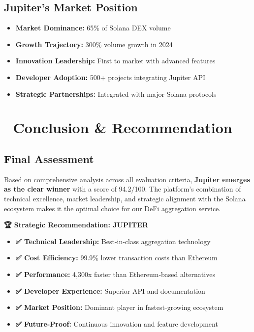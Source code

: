 \documentclass[11pt,a4paper]{article}
\begin{document}
\subsection{Jupiter's Market Position}

\begin{itemize}
    \item \textbf{Market Dominance:} 65\% of Solana DEX volume
    \item \textbf{Growth Trajectory:} 300\% volume growth in 2024
    \item \textbf{Innovation Leadership:} First to market with advanced features
    \item \textbf{Developer Adoption:} 500+ projects integrating Jupiter API
    \item \textbf{Strategic Partnerships:} Integrated with major Solana protocols
\end{itemize}

\section{🎯 Conclusion \& Recommendation}

\subsection{Final Assessment}

Based on comprehensive analysis across all evaluation criteria, \textbf{Jupiter emerges as the clear winner} with a score of 94.2/100. The platform's combination of technical excellence, market leadership, and strategic alignment with the Solana ecosystem makes it the optimal choice for our DeFi aggregation service.

\begin{tcolorbox}[colback=successGreen!10,colframe=successGreen]
\textbf{🏆 Strategic Recommendation: JUPITER}
\begin{itemize}
    \item \textbf{✅ Technical Leadership:} Best-in-class aggregation technology
    \item \textbf{✅ Cost Efficiency:} 99.9\% lower transaction costs than Ethereum
    \item \textbf{✅ Performance:} 4,300x faster than Ethereum-based alternatives
    \item \textbf{✅ Developer Experience:} Superior API and documentation
    \item \textbf{✅ Market Position:} Dominant player in fastest-growing ecosystem
    \item \textbf{✅ Future-Proof:} Continuous innovation and feature development
\end{itemize}
\end{tcolorbox}
\end{document}

